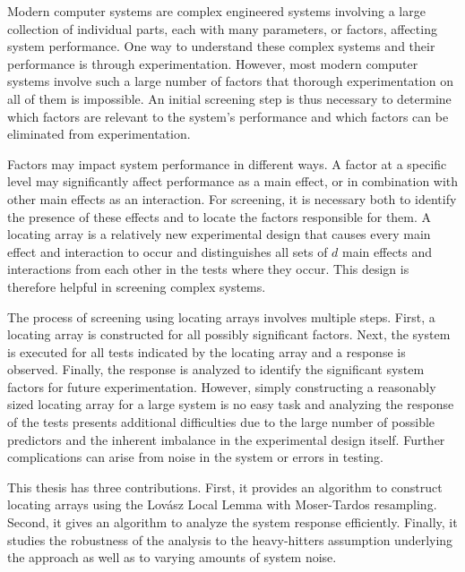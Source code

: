 Modern computer systems are complex engineered systems involving a large collection of individual parts, each with many parameters, or factors, affecting system performance.
One way to understand these complex systems and their performance is through experimentation.
However, most modern computer systems involve such a large number of factors that thorough experimentation on all of them is impossible.
An initial screening step is thus necessary to determine which factors are relevant to the system's performance and which factors can be eliminated from experimentation.

Factors may impact system performance in different ways.
A factor at a specific level may significantly affect performance as a main effect, or in combination with other main effects as an interaction.
For screening, it is necessary both to identify the presence of these effects and to locate the factors responsible for them.
A locating array is a relatively new experimental design that causes every main effect and interaction to occur and distinguishes all sets of $d$ main effects and interactions from each other in the tests where they occur.
This design is therefore helpful in screening complex systems.

The process of screening using locating arrays involves multiple steps.
First, a locating array is constructed for all possibly significant factors.
Next, the system is executed for all tests indicated by the locating array and a response is observed.
Finally, the response is analyzed to identify the significant system factors for future experimentation.
However, simply constructing a reasonably sized locating array for a large system is no easy task and analyzing the response of the tests presents additional difficulties due to the large number of possible predictors and the inherent imbalance in the experimental design itself.
Further complications can arise from noise in the system or errors in testing.

This thesis has three contributions.
First, it provides an algorithm to construct locating arrays using the Lov{\'a}sz Local Lemma with Moser-Tardos resampling.
Second, it gives an algorithm to analyze the system response efficiently.
Finally, it studies the robustness of the analysis to the heavy-hitters assumption underlying the approach as well as to varying amounts of system noise.
